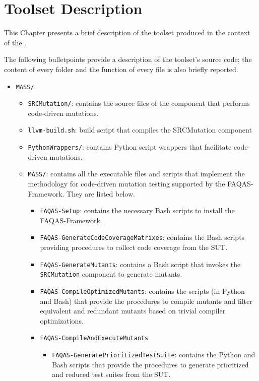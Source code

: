 
\chapter{Toolset Description}

This Chapter presents a brief description of the toolset produced in the context of the \FAQAS.

The following bulletpoints provide a description of the toolset's source code; the content of every folder and the function of every file is also briefly reported.

\begin{itemize}
	\item \texttt{MASS/}
	\begin{itemize}
		\item \texttt{SRCMutation/}: contains the source files of the component that performs code-driven mutations.
		\item \texttt{llvm-build.sh}: build script that compiles the SRCMutation component
		\item \texttt{PythonWrappers/}: contains Python script wrappers that facilitate code-driven mutations.
		\item \texttt{MASS/}: contains all the executable files and scripts that implement the methodology for code-driven mutation testing supported by  the FAQAS-Framework. They are listed below.
		\begin{itemize}
			\item \texttt{FAQAS-Setup}: contains the necessary Bash scripts to install the FAQAS-Framework.
			\item \texttt{FAQAS-GenerateCodeCoverageMatrixes}: contains the Bash scripts providing procedures to collect code coverage from the SUT.
			\item \texttt{FAQAS-GenerateMutants}: contains a Bash script that invokes the \texttt{SRCMutation} component to generate mutants.
			\item \texttt{FAQAS-CompileOptimizedMutants}: contains the scripts (in Python and Bash)  that provide the procedures to compile mutants and filter equivalent and redundant mutants based on trivial compiler optimizations.
			\item \texttt{FAQAS-CompileAndExecuteMutants}
			\begin{itemize}
				\item \texttt{FAQAS-GeneratePrioritizedTestSuite}: contains the Python and Bash scripts that provide the procedures to generate prioritized and reduced test suites from the SUT.


\end{itemize}
\end{itemize}
\end{itemize}
\end{itemize}
